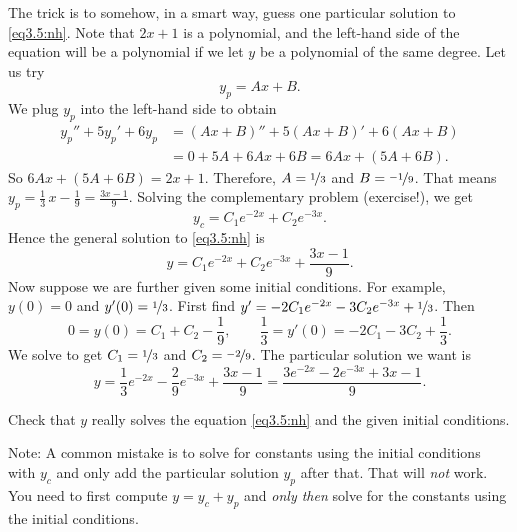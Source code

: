 The trick is to somehow, in a smart way, guess one particular solution to
\eqref{eq3.5:nh}.  Note that $2x+1$ is a polynomial, and the left-hand 
side of the equation will be a polynomial if we let $y$ be a polynomial of
the same degree.  Let us try
\begin{equation*}
y_p = Ax + B .
\end{equation*}
We plug $y_p$ into the left-hand side to obtain
\begin{equation*}
\begin{split}
y_p'' + 5y_p'+ 6y_p & =
(Ax+B)'' + 5(Ax+B)' + 6(Ax+B)
\\
& = 
0 + 5A + 6Ax + 6B = 6Ax+ (5A+6B) .
\end{split}
\end{equation*}
So $6Ax+(5A+6B) = 2x+1$.  Therefore, $A = \nicefrac{1}{3}$ and $B = \nicefrac{-1}{9}$.
That means
$y_p = \frac{1}{3}\, x - \frac{1}{9} = \frac{3x-1}{9}$.
Solving the complementary
problem (exercise!), we get
\begin{equation*}
y_c = C_1 e^{-2x} + C_2 e^{-3x}.
\end{equation*}
Hence the general solution to \eqref{eq3.5:nh} is
\begin{equation*}
y = C_1 e^{-2x} + C_2 e^{-3x} + \frac{3x-1}{9} .
\end{equation*}
Now suppose we are further given some initial conditions.  For example, $y(0) = 0$ and
$y'(0) = \nicefrac{1}{3}$.  First find $y' = - 2C_1 e^{-2x} - 3C_2 e^{-3x}
+ \nicefrac{1}{3}$.
Then
\begin{equation*}
0 = y(0) = C_1 + C_2 -\frac{1}{9} , \qquad
\frac{1}{3} = y'(0) = - 2C_1 - 3C_2 + \frac{1}{3} .
\end{equation*}
We solve to get $C_1 = \nicefrac{1}{3}$ and $C_2 = \nicefrac{-2}{9}$.
The particular solution we want is
\begin{equation*}
y = \frac{1}{3} e^{-2x} - \frac{2}{9} e^{-3x} + \frac{3x-1}{9} =
\frac{3 e^{-2x} - 2 e^{-3x} + 3x-1}{9} .
\end{equation*}

\begin{exercise}
Check that $y$ really solves the equation \eqref{eq3.5:nh}
and the given initial conditions.
\end{exercise}

Note: A common mistake is to solve for constants using the initial
conditions with $y_c$ and only add the particular solution $y_p$ after that.
That will \emph{not} work.  You need to first compute $y = y_c + y_p$ and
\emph{only then} solve for the constants using the initial conditions.

